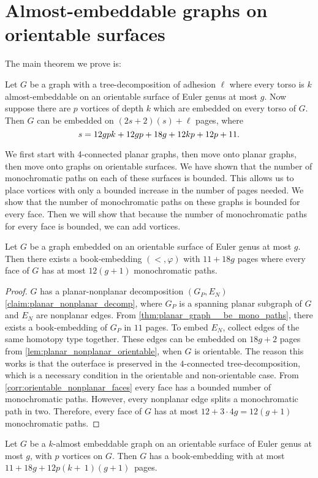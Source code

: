 \section{Almost-embeddable graphs on orientable surfaces}

The main theorem we prove is:
\begin{theorem}\label{thm:orientablevortices}
	Let $G$ be a graph with a tree-decomposition of adhesion $\ell$ where every torso is $k$ almost-embeddable on an orientable surface of Euler genus at most $g$. Now suppose there are $p$ vortices of depth $k$ which are embedded on every torso of $G$. Then $G$ can be embedded on $(2s + 2)(s) + \ell$ pages, where \[s = 12gpk + 12gp + 18g + 12kp + 12p + 11.\] 
\end{theorem}
We first start with 4-connected planar graphs, then move onto planar graphs, then move onto graphs on orientable surfaces. We have shown that the number of monochromatic paths on each of these surfaces is bounded. This allows us to place vortices with only a bounded increase in the number of pages needed. We show that the number of monochromatic paths on these graphs is bounded for every face. Then we will show that because the number of monochromatic paths for every face is bounded, we can add vortices.

\begin{lemma}\label{lem:orientablesurfaces_monochromatic_edges}
	Let $G$ be a graph embedded on an orientable surface of Euler genus at most $g$. Then there exists a book-embedding $(<, \varphi)$ with $11 + 18g$ pages where every face of $G$ has at most $12(g + 1)$ monochromatic paths.
\end{lemma}
\begin{proof}
	$G$ has a planar-nonplanar decomposition $(G_P, E_N)$ \cref{claim:planar_nonplanar_decomp}, where $G_P$ is a spanning planar subgraph of $G$ and $E_N$ are nonplanar edges. From \cref{thm:planar_graph__be_mono_paths}, there exists a book-embedding of $G_P$ in $11$ pages. To embed $E_N$, collect edges of the same homotopy type together. These edges can be embedded on $18g+2$ pages from \cref{lem:planar_nonplanar_orientable}, when $G$ is orientable. The reason this works is that the outerface is preserved in the $4$-connected tree-decomposition, which is a necessary condition in the orientable and non-orientable case.
	From \cref{corr:orientable_nonplanar_faces} every face has a bounded number of monochromatic paths. However, every nonplanar edge splits a monochromatic path in two. Therefore, every face of $G$ has at most $12 + 3 \cdot 4g = 12(g + 1)$ monochromatic paths.
\end{proof}
\begin{lemma}\label{lem:orientablesurfaces_almostembeddable}
	Let $G$ be a $k$-almost embeddable graph on an orientable surface of Euler genus at most $g$, with $p$ vortices on $G$. Then $G$ has a book-embedding with at most $11+18g+12p(k +~1)(g + 1)$~pages.
\end{lemma}

